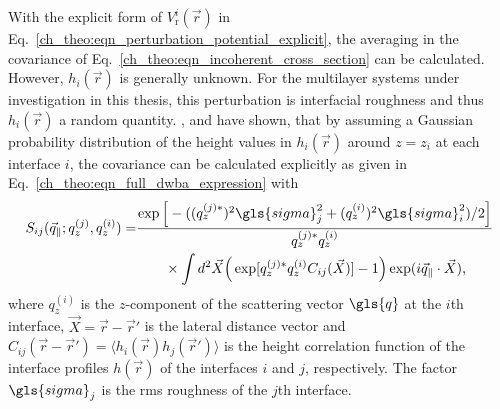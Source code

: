 With the explicit form of $V^i_\text{r}(\vec{r})$ in Eq.~\eqref{ch_theo:eqn_perturbation_potential_explicit}, the averaging in the covariance of Eq.~\eqref{ch_theo:eqn_incoherent_cross_section} can be calculated. However, $h_i(\vec{r})$ is generally unknown. For the multilayer systems under investigation in this thesis, this perturbation is interfacial roughness and thus $h_i(\vec{r})$ a random quantity. \textcite{sinha_x-ray_1988}, \textcite{de_boer_x-ray_1995} and \textcite{mikulik_x-ray_1997} have shown, that by assuming a Gaussian probability distribution of the height values in $h_i(\vec{r})$ around $z=z_i$ at each interface $i$, the covariance can be calculated explicitly as given in Eq.~\eqref{ch_theo:eqn_full_dwba_expression} with
\begin{align}
S_{ij}(\vec{q}_\parallel; q_z^{(j)}, q_z^{(i)}) = &\frac{\exp \Big[-((q_z^{(j)*})^{2} \gls{sigma}_j^2 + (q_z^{(i)})^{2} \gls{sigma}_i^2)/2\Big]}{q_z^{(j)*} q_z^{(i)}}  \nonumber \\
&\qquad \times \int d^2 \vec{X} \Big(\exp [q_z^{(j)*} q_z^{(i)} C_{ij}(\vec{X})]-1\Big) \exp(i \vec{q}_\parallel \cdot \vec{X}) \text{,} \label{ch_theo:eqn_full_dwba_roughness_factor}
\end{align}
where $q_z^{(i)}$ is the $z$-component of the scattering vector $\gls{q}$ at the $i$th interface, $\vec{X} = \vec{r} - \vec{r}'$ is the lateral distance vector and $C_{ij}(\vec{r}-\vec{r}') = \langle h_i(\vec{r}) h_j(\vec{r}') \rangle$ is the height correlation function of the interface profiles $h(\vec{r})$ of the interfaces $i$ and $j$, respectively. The factor $\gls{sigma}_j$ is the \gls{rms} roughness of the $j$th interface.


